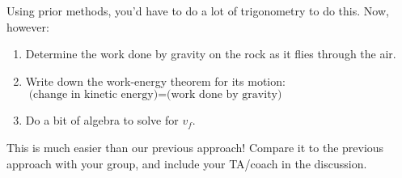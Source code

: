 \documentclass[12pt]{article}
\begin{document}
Using prior methods, you'd have to do a lot of trigonometry to do this. Now, however:

\begin{enumerate}
	\item Determine the work done by gravity on the rock as it flies through the air.
	\vspace{1.5in}
	
	\item Write down the work-energy theorem for its motion: $\text{(change in kinetic energy)}=\text{(work done by gravity)}$
	\vspace{1.5in}
	
	\item Do a bit of algebra to solve for $v_f$.
\end{enumerate}

\vfill

This is much easier than our previous approach! Compare it to the previous approach with your group, and include your TA/coach in the discussion.
\end{document}
